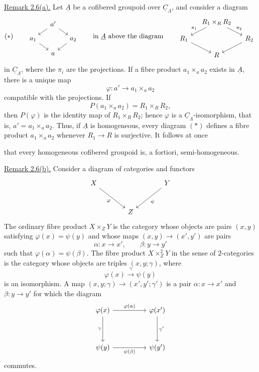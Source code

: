 \underline{Remark 2.6(a).} Let $\underline A$ be a cofibered
groupoid over $\underline C_\Lambda$, and consider a diagram
\[
(*)\qquad
\begin{tikzcd}[row sep=small,column sep=small]
 & a' \arrow[dl] \arrow[dr] & \\
 a_1 \arrow[dr] & & a_2 \arrow[dl]\\
 & a &
\end{tikzcd}
\qquad\text{in $\underline A$ above the diagram}\qquad
\begin{tikzcd}[row sep=small,column sep=small]
 & R_1\times_R R_2 \arrow[dl,"{\pi_1}"'] \arrow[dr,"{\pi_2}"] & \\
 R_1 \arrow[dr] & & R_2 \arrow[dl]\\
 & R &
\end{tikzcd}
\]
in $\underline C_\Lambda$, where the $\pi_i$ are the projections.
If a fibre product $a_1\times_a a_2$ exists in $\underline A$,
there is a unique map
\[
 \varphi:a'\longrightarrow a_1\times_a a_2
\]
compatible with the projections. If
\[
 P(a_1\times_a a_2)=R_1\times_R R_2,
\]
then $P(\varphi)$ is the identity map of $R_1\times_R R_2$;
hence $\varphi$ is a $\underline C_\Lambda$-isomorphism, that is,
$a'=a_1\times_a a_2$. Thus, if $\underline A$ is homogeneous,
every diagram $(*)$ defines a fibre product $a_1\times_a a_2$
whenever $R_1\longrightarrow R$ is surjective. It follows at once


that every homogeneous cofibered groupoid is, a fortiori,
semi-homogeneous.

\underline{Remark 2.6(b).} Consider a diagram of categories and
functors
\[
\begin{tikzcd}[row sep=large,column sep=large]
 X \arrow[dr,"{\varphi}"'] & & Y \arrow[dl,"{\psi}"]\\
 & Z &
\end{tikzcd}
\]
The ordinary fibre product $X\times_ZY$ is the category whose
objects are pairs $(x,y)$ satisfying $\varphi(x)=\psi(y)$ and whose
maps $(x,y)\longrightarrow(x',y')$ are pairs
\[
 \alpha:x\longrightarrow x',\qquad
 \beta:y\longrightarrow y'
\]
such that $\varphi(\alpha)=\psi(\beta)$. The fibre product
$X\times_Z^2Y$ in the sense of $2$-categories is the category whose
objects are triples $(x,y;\gamma)$, where
\[
 \varphi(x)\xrightarrow{\ \gamma\ }\psi(y)
\]
is an isomorphism. A map
$(x,y;\gamma)\longrightarrow(x',y';\gamma')$ is a pair
$\alpha:x\longrightarrow x'$ and $\beta:y\longrightarrow y'$ for
which the diagram
\[
\begin{tikzcd}[row sep=huge,column sep=huge]
 \varphi(x) \arrow[r,"{\varphi(\alpha)}"] \arrow[d,"{\gamma}"']
 & \varphi(x') \arrow[d,"{\gamma'}"]\\
 \psi(y) \arrow[r,"{\psi(\beta)}"'] & \psi(y')
\end{tikzcd}
\]
commutes.

